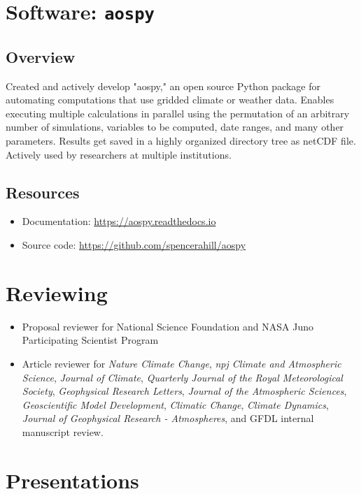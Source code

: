 \documentclass[12pt,letterpaper]{shillcv}
\begin{document}
\section*{Software: \texttt{aospy}}
\label{sec:org62f3620}
\subsection*{Overview}
\label{sec:org668c65e}
Created and actively develop "aospy," an open source Python package for
automating computations that use gridded climate or weather data.  Enables
executing multiple calculations in parallel using the permutation of an
arbitrary number of simulations, variables to be computed, date ranges, and many
other parameters.  Results get saved in a highly organized directory tree as
netCDF file.  Actively used by researchers at multiple institutions.

\subsection*{Resources}
\label{sec:org4c2210e}
\begin{itemize}
\item Documentation: \url{https://aospy.readthedocs.io}
\item Source code: \url{https://github.com/spencerahill/aospy}
\end{itemize}
\section*{Reviewing}
\label{sec:org5ca0eda}
\begin{itemize}
\item Proposal reviewer for National Science Foundation and NASA Juno Participating
Scientist Program
\item Article reviewer for \emph{Nature Climate Change}, \emph{npj Climate and Atmospheric
Science}, \emph{Journal of Climate}, \emph{Quarterly Journal of the Royal Meteorological
Society}, \emph{Geophysical Research Letters}, \emph{Journal of the Atmospheric
Sciences}, \emph{Geoscientific Model Development}, \emph{Climatic Change}, \emph{Climate
Dynamics}, \emph{Journal of Geophysical Research - Atmospheres}, and GFDL internal
manuscript review.
\end{itemize}

\section*{Presentations}
\label{sec:org4b73b1f}
\end{document}
